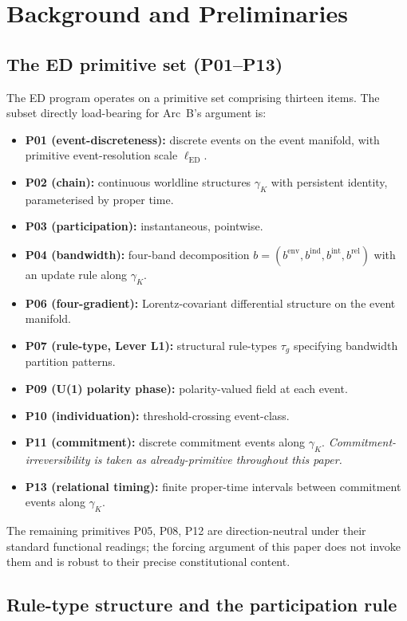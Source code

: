 \documentclass[11pt,a4paper]{article}
\begin{document}
\section{Background and Preliminaries}

\subsection{The ED primitive set (P01--P13)}

The ED program operates on a primitive set comprising thirteen items. The subset directly load-bearing for Arc~B's argument is:
\begin{itemize}[leftmargin=1.5em]
  \item \textbf{P01 (event-discreteness):} discrete events on the event manifold, with primitive event-resolution scale $\ell_\mathrm{ED}$.
  \item \textbf{P02 (chain):} continuous worldline structures $\gamma_K$ with persistent identity, parameterised by proper time.
  \item \textbf{P03 (participation):} instantaneous, pointwise.
  \item \textbf{P04 (bandwidth):} four-band decomposition $b = (b^\mathrm{env}, b^\mathrm{ind}, b^\mathrm{int}, b^\mathrm{rel})$ with an update rule along $\gamma_K$.
  \item \textbf{P06 (four-gradient):} Lorentz-covariant differential structure on the event manifold.
  \item \textbf{P07 (rule-type, Lever L1):} structural rule-types $\tau_g$ specifying bandwidth partition patterns.
  \item \textbf{P09 (U(1) polarity phase):} polarity-valued field at each event.
  \item \textbf{P10 (individuation):} threshold-crossing event-class.
  \item \textbf{P11 (commitment):} discrete commitment events along $\gamma_K$. \emph{Commitment-irreversibility is taken as already-primitive throughout this paper.}
  \item \textbf{P13 (relational timing):} finite proper-time intervals between commitment events along $\gamma_K$.
\end{itemize}

The remaining primitives P05, P08, P12 are direction-neutral under their standard functional readings; the forcing argument of this paper does not invoke them and is robust to their precise constitutional content.

\subsection{Rule-type structure and the participation rule}
\end{document}
